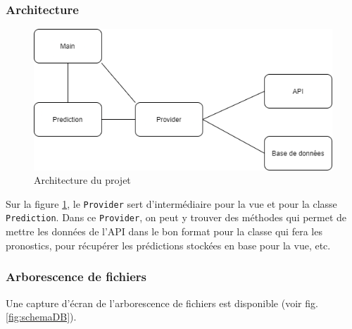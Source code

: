 \documentclass[a4paper,14pt]{extarticle}
\begin{document}
{\subsubsection{Architecture}
\begin{figure}[htp]
    \centering
    \includegraphics[width=15cm]{../img/architectureClasse.png}
    \caption{Architecture du projet}
    \label{fig:architectureClasse}
\end{figure}

Sur la figure \ref{fig:architectureClasse}, le \texttt{Provider} sert d'intermédiaire pour la vue et pour la classe \texttt{Prediction}. Dans ce \texttt{Provider}, on peut y trouver des méthodes qui permet de mettre les données de l'API dans le bon format pour la classe qui fera les pronostics, pour récupérer les prédictions stockées en base pour la vue, etc.

\subsubsection{Arborescence de fichiers}

Une capture d'écran de l'arborescence de fichiers est disponible (voir fig. \ref{fig:schemaDB}). 

}
\end{document}
